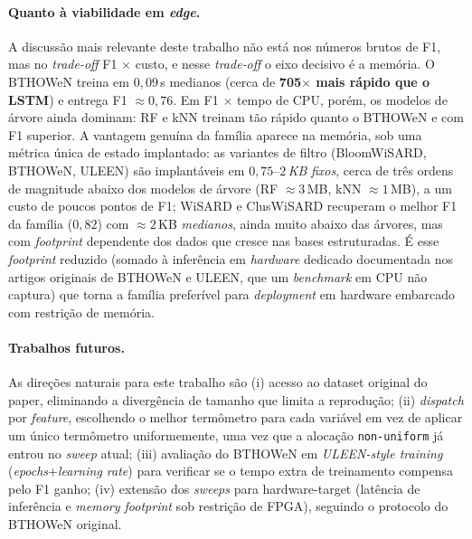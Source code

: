 \paragraph{Quanto à viabilidade em \emph{edge}.} A discussão mais
relevante deste trabalho não está nos números brutos de F1, mas no
\emph{trade-off} F1 $\times$ custo, e nesse \emph{trade-off} o eixo
decisivo é a memória. O BTHOWeN treina em $0{,}09$\,s medianos (cerca de
\textbf{705$\times$ mais rápido que o LSTM}) e entrega F1 $\approx 0{,}76$.
Em F1 $\times$ tempo de CPU, porém, os modelos de árvore ainda dominam:
RF e kNN treinam tão rápido quanto o BTHOWeN e com F1 superior. A
vantagem genuína da família aparece na memória, sob uma métrica única de
estado implantado: as variantes de filtro (BloomWiSARD, BTHOWeN, ULEEN)
são implantáveis em $0{,}75$--$2$\,\emph{KB} \emph{fixos}, cerca de três
ordens de magnitude abaixo dos modelos de árvore (RF $\approx 3$\,MB,
kNN $\approx 1$\,MB), a um custo de poucos pontos de F1; WiSARD e
ClusWiSARD recuperam o melhor F1 da família ($0{,}82$) com
$\approx 2$\,KB \emph{medianos}, ainda muito abaixo das árvores, mas
com \emph{footprint} dependente dos dados que cresce nas bases
estruturadas. É esse \emph{footprint} reduzido (somado à inferência em
\emph{hardware} dedicado documentada nos artigos originais de BTHOWeN e
ULEEN, que um \emph{benchmark} em CPU não captura) que torna a
família preferível para \emph{deployment} em hardware embarcado com
restrição de memória.

\paragraph{Trabalhos futuros.} As direções naturais para este trabalho
são (i) acesso ao dataset original do paper, eliminando a divergência
de tamanho que limita a reprodução; (ii) \emph{dispatch} por \emph{feature}, escolhendo o melhor
termômetro para cada variável em vez de aplicar um único termômetro
uniformemente, uma vez que a alocação \texttt{non-uniform} já entrou no
\emph{sweep} atual;
(iii) avaliação do BTHOWeN em \emph{ULEEN-style training}
(\emph{epochs}+\emph{learning rate}) para verificar se o tempo extra
de treinamento compensa pelo F1 ganho; (iv) extensão dos
\emph{sweeps} para hardware-target (latência de inferência e
\emph{memory footprint} sob restrição de FPGA), seguindo o protocolo
do BTHOWeN original.

